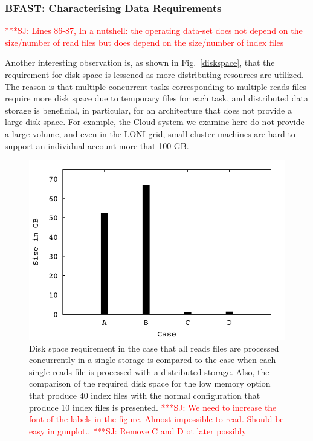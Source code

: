 \documentclass[12pt]{article}
\newcommand{\jhanote}[1]{ {\textcolor{red}     {***SJ: #1}}}
\newcommand{\jhanote}[1]{}
\begin{document}
\subsubsection{BFAST: Characterising Data Requirements}

\jhanote{Lines 86-87, In a nutshell: the operating data-set does not depend on the size/number of read files but does depend on the size/number of index files}

Another interesting observation is, as shown in Fig.~\ref{diskspace}, that the requirement for disk space is lessened as more distributing resources are utilized. The reason is that multiple concurrent tasks corresponding to multiple reads files require more disk space due to temporary files for each task, and distributed data storage is beneficial, in particular, for an architecture that does not provide a large disk space.  For example, the Cloud system we examine here do not provide a large volume, and even in the LONI grid, small cluster machines are hard to support an individual account more that 100 GB.

\begin{figure}
 \centering
\includegraphics[scale=0.66]{figures/diskspace.pdf}
\caption{\small Disk space requirement in the case that all reads
  files are processed concurrently in a single storage is compared to
  the case when each single reads file is processed with a distributed
  storage.  Also, the comparison of the required disk space for the
  low memory option that produce 40 index files with the normal
  configuration that produce 10 index files is presented. \jhanote{We
    need to increase the font of the labels in the figure. Almost
    impossible to read. Should be easy in gnuplot..} \jhanote{Remove C and D ot later possibly}}
  \label{fig:diskspace} 
 \end{figure}
\end{document}
